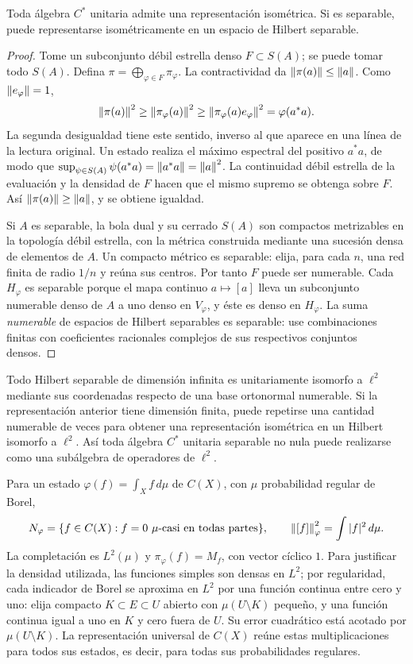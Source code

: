 \begin{teorema}\label{v3:gelfand-naimark}
Toda álgebra $C^*$ unitaria admite una representación isométrica. Si es separable, puede representarse isométricamente en un espacio de Hilbert separable.
\end{teorema}
\begin{proof}
Tome un subconjunto débil estrella denso $F\subset S(A)$; se puede tomar todo $S(A)$. Defina $\pi=\bigoplus_{\varphi\in F}\pi_\varphi$. La contractividad da $\left\lVert\pi(a)\right\rVert\le\left\lVert a\right\rVert$. Como $\left\lVert e_\varphi\right\rVert=1$,
\[
 \left\lVert\pi(a)\right\rVert^2\ge\left\lVert\pi_\varphi(a)\right\rVert^2
 \ge\left\lVert\pi_\varphi(a)e_\varphi\right\rVert^2=\varphi(a^*a).
\]
La segunda desigualdad tiene este sentido, inverso al que aparece en una línea de la lectura original. Un estado realiza el máximo espectral del positivo $a^*a$, de modo que $\sup_{\psi\in S(A)}\psi(a^*a)=\left\lVert a^*a\right\rVert=\left\lVert a\right\rVert^2$. La continuidad débil estrella de la evaluación y la densidad de $F$ hacen que el mismo supremo se obtenga sobre $F$. Así $\left\lVert\pi(a)\right\rVert\ge\left\lVert a\right\rVert$, y se obtiene igualdad.

Si $A$ es separable, la bola dual y su cerrado $S(A)$ son compactos metrizables en la topología débil estrella, con la métrica construida mediante una sucesión densa de elementos de $A$. Un compacto métrico es separable: elija, para cada $n$, una red finita de radio $1/n$ y reúna sus centros. Por tanto $F$ puede ser numerable. Cada $H_\varphi$ es separable porque el mapa continuo $a\mapsto[a]$ lleva un subconjunto numerable denso de $A$ a uno denso en $V_\varphi$, y éste es denso en $H_\varphi$. La suma \emph{numerable} de espacios de Hilbert separables es separable: use combinaciones finitas con coeficientes racionales complejos de sus respectivos conjuntos densos.
\end{proof}

Todo Hilbert separable de dimensión infinita es unitariamente isomorfo a $\ell^2$ mediante sus coordenadas respecto de una base ortonormal numerable. Si la representación anterior tiene dimensión finita, puede repetirse una cantidad numerable de veces para obtener una representación isométrica en un Hilbert isomorfo a $\ell^2$. Así toda álgebra $C^*$ unitaria separable no nula puede realizarse como una subálgebra de operadores de $\ell^2$.

\begin{ejemplo}
Para un estado $\varphi(f)=\int_Xf\,d\mu$ de $C(X)$, con $\mu$ probabilidad regular de Borel,
\[
 N_\varphi=\{f\in C(X):f=0\ \mu\text{-casi en todas partes}\},
 \qquad\left\lVert[f]\right\rVert_\varphi^2=\int|f|^2\,d\mu.
\]
La completación es $L^2(\mu)$ y $\pi_\varphi(f)=M_f$, con vector cíclico $1$. Para justificar la densidad utilizada, las funciones simples son densas en $L^2$; por regularidad, cada indicador de Borel se aproxima en $L^2$ por una función continua entre cero y uno: elija compacto $K\subset E\subset U$ abierto con $\mu(U\setminus K)$ pequeño, y una función continua igual a uno en $K$ y cero fuera de $U$. Su error cuadrático está acotado por $\mu(U\setminus K)$. La representación universal de $C(X)$ reúne estas multiplicaciones para todos sus estados, es decir, para todas sus probabilidades regulares.
\end{ejemplo}

